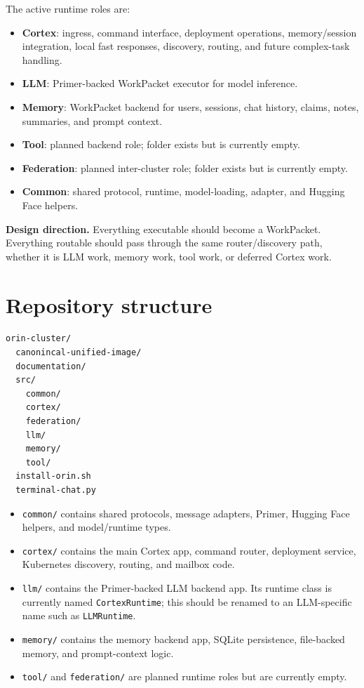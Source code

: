 \documentclass[11pt,a4paper]{article}
\begin{document}
The active runtime roles are:
\begin{itemize}[leftmargin=1.2em]
  \item \textbf{Cortex}: ingress, command interface, deployment operations, memory/session integration, local fast responses, discovery, routing, and future complex-task handling.
  \item \textbf{LLM}: Primer-backed WorkPacket executor for model inference.
  \item \textbf{Memory}: WorkPacket backend for users, sessions, chat history, claims, notes, summaries, and prompt context.
  \item \textbf{Tool}: planned backend role; folder exists but is currently empty.
  \item \textbf{Federation}: planned inter-cluster role; folder exists but is currently empty.
  \item \textbf{Common}: shared protocol, runtime, model-loading, adapter, and Hugging Face helpers.
\end{itemize}

\begin{infobox}
\textbf{Design direction.} Everything executable should become a WorkPacket. Everything routable should pass through the same router/discovery path, whether it is LLM work, memory work, tool work, or deferred Cortex work.
\end{infobox}

\section{Repository structure}
\begin{lstlisting}
orin-cluster/
  canonincal-unified-image/
  documentation/
  src/
    common/
    cortex/
    federation/
    llm/
    memory/
    tool/
  install-orin.sh
  terminal-chat.py
\end{lstlisting}

\begin{itemize}[leftmargin=1.2em]
  \item \texttt{common/} contains shared protocols, message adapters, Primer, Hugging Face helpers, and model/runtime types.
  \item \texttt{cortex/} contains the main Cortex app, command router, deployment service, Kubernetes discovery, routing, and mailbox code.
  \item \texttt{llm/} contains the Primer-backed LLM backend app. Its runtime class is currently named \texttt{CortexRuntime}; this should be renamed to an LLM-specific name such as \texttt{LLMRuntime}.
  \item \texttt{memory/} contains the memory backend app, SQLite persistence, file-backed memory, and prompt-context logic.
  \item \texttt{tool/} and \texttt{federation/} are planned runtime roles but are currently empty.
\end{itemize}
\end{document}
